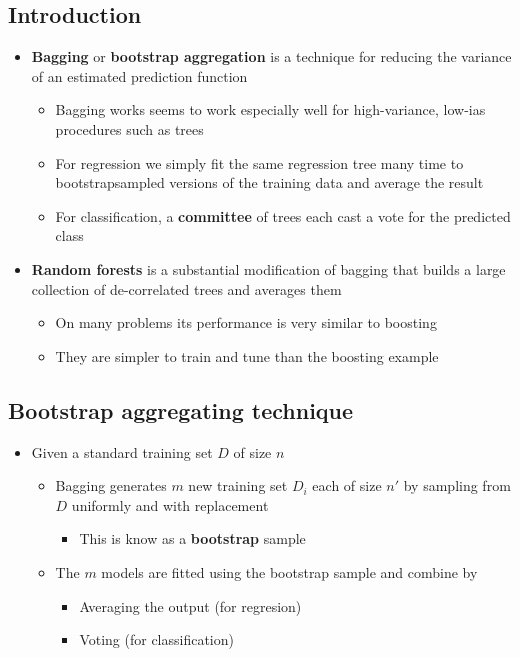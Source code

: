 \documentclass[11pt]{article}
\begin{document}
\subsection{Introduction}
\label{sec:orgf1d2dba}
\begin{itemize}
\item \textbf{Bagging} or \textbf{bootstrap aggregation} is a technique for reducing the variance of an estimated prediction function
\begin{itemize}
\item Bagging works seems to work especially well for high-variance, low-ias procedures such as trees
\item For regression we simply fit the same regression tree many time to bootstrapsampled versions of the training data and average the result
\item For classification, a \textbf{committee} of trees each cast a vote for the predicted class
\end{itemize}

\item \textbf{Random forests} is a substantial modification of bagging that builds a large collection of de-correlated trees and averages them
\begin{itemize}
\item On many problems its performance is very similar to boosting
\item They are simpler to train and tune than the boosting example
\end{itemize}
\end{itemize}

\subsection{Bootstrap aggregating technique}
\label{sec:org60de636}
\begin{itemize}
\item Given a standard training set \(D\) of size \(n\)
\begin{itemize}
\item Bagging generates \(m\) new training set \(D_i\) each of size \(n'\) by sampling from \(D\) uniformly and with replacement
\begin{itemize}
\item This is know as a \textbf{bootstrap} sample
\end{itemize}
\item The \(m\) models are fitted using the bootstrap sample and combine by
\begin{itemize}
\item Averaging the output (for regresion)
\item Voting (for classification)
\end{itemize}
\end{itemize}
\end{itemize}
\end{document}
